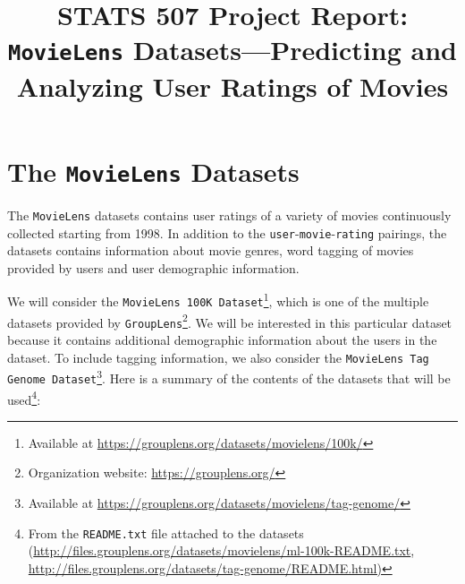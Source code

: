 \documentclass[bj, preprint]{imsart}
\begin{document}
\begin{frontmatter}

\title{{\Large STATS 507 Project Report:} \\ 
\bf \texttt{MovieLens} Datasets---Predicting and Analyzing User Ratings of Movies}






\tableofcontents
\listoftodos
\end{frontmatter}



\section{The \texttt{MovieLens} Datasets}\label{sec:dataset}

The \texttt{MovieLens} datasets \citep{harper2015MovieLensDatasetsHistory} contains user ratings of a variety of movies continuously collected starting from 1998. 
In addition to the \texttt{user}-\texttt{movie}-\texttt{rating} pairings, the datasets contains information about movie genres, word tagging of movies provided by users and user demographic information. 

We will consider the \texttt{MovieLens 100K Dataset}\footnote{Available at \url{https://grouplens.org/datasets/movielens/100k/}}, which is one of the multiple datasets provided by \texttt{GroupLens}\footnote{Organization website: \url{https://grouplens.org/}}. 
We will be interested in this particular dataset because it contains additional demographic information about the users in the dataset. 
To include tagging information, we also consider the \texttt{MovieLens Tag Genome Dataset}\footnote{Available at \url{https://grouplens.org/datasets/movielens/tag-genome/}}. 
Here is a summary of the contents of the datasets that will be used\footnote{From the \texttt{README.txt} file attached to the datasets (\url{http://files.grouplens.org/datasets/movielens/ml-100k-README.txt}, \url{http://files.grouplens.org/datasets/tag-genome/README.html)}}:
\end{document}
